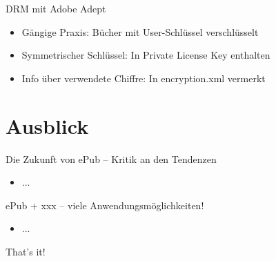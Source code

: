 \documentclass[hyperref={pdfpagelabels=false}]{beamer}
\begin{document}
\begin{frame}{DRM mit Adobe Adept}
	\begin{itemize}
		\item Gängige Praxis: Bücher mit User-Schlüssel verschlüsselt
		\item Symmetrischer Schlüssel: In Private License Key enthalten
		\item Info über verwendete Chiffre: In encryption.xml vermerkt
	\end{itemize}
\end{frame}


\section{Ausblick}

\begin{frame}{Die Zukunft von ePub -- Kritik an den Tendenzen}
	\begin{itemize}
		\item ...
	\end{itemize}
\end{frame}

\begin{frame}{ePub + xxx -- viele Anwendungsmöglichkeiten!}
	\begin{itemize}
		\item ...
	\end{itemize}
\end{frame}


\begin{frame}[plain]
	That's it!
	\begin{center}
	\end{center}
\end{frame}


\end{document}
